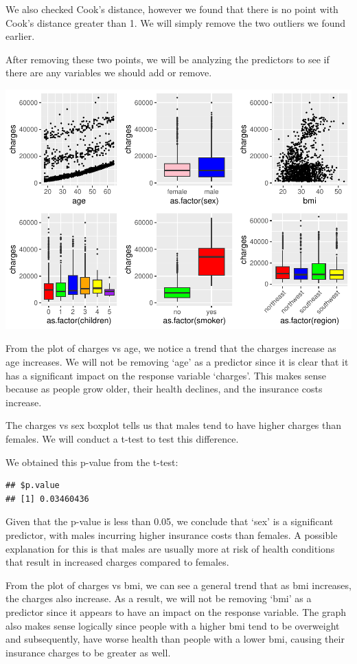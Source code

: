 \documentclass[
  12pt,
]{article}
\begin{document}
We also checked Cook's distance, however we found that there is no point
with Cook's distance greater than 1. We will simply remove the two
outliers we found earlier.

\newpage

After removing these two points, we will be analyzing the predictors to
see if there are any variables we should add or remove.

\includegraphics{finalproject_files/figure-latex/unnamed-chunk-7-1.pdf}

From the plot of charges vs age, we notice a trend that the charges
increase as age increases. We will not be removing `age' as a predictor
since it is clear that it has a significant impact on the response
variable `charges'. This makes sense because as people grow older, their
health declines, and the insurance costs increase.

The charges vs sex boxplot tells us that males tend to have higher
charges than females. We will conduct a t-test to test this difference.

We obtained this p-value from the t-test:

\begin{verbatim}
## $p.value
## [1] 0.03460436
\end{verbatim}

Given that the p-value is less than 0.05, we conclude that `sex' is a
significant predictor, with males incurring higher insurance costs than
females. A possible explanation for this is that males are usually more
at risk of health conditions that result in increased charges compared
to females.

From the plot of charges vs bmi, we can see a general trend that as bmi
increases, the charges also increase. As a result, we will not be
removing `bmi' as a predictor since it appears to have an impact on the
response variable. The graph also makes sense logically since people
with a higher bmi tend to be overweight and subsequently, have worse
health than people with a lower bmi, causing their insurance charges to
be greater as well.
\end{document}
